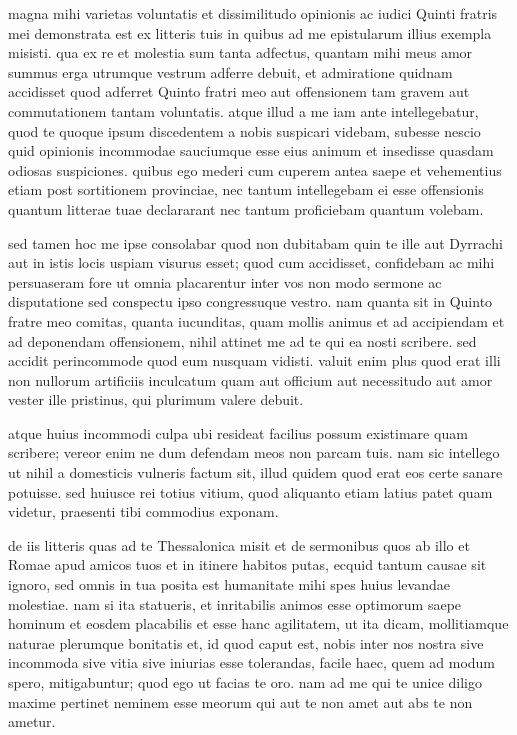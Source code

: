 


 magna mihi varietas voluntatis et dissimilitudo opinionis ac iudici Quinti fratris mei demonstrata est ex litteris tuis in quibus ad me epistularum illius exempla misisti. qua ex re et molestia sum tanta adfectus, quantam mihi meus amor summus erga utrumque vestrum adferre debuit, et admiratione quidnam accidisset quod adferret Quinto fratri meo aut offensionem tam gravem aut commutationem tantam voluntatis. atque illud a me iam ante intellegebatur, quod te quoque ipsum discedentem a nobis suspicari videbam, subesse nescio quid opinionis incommodae sauciumque esse eius animum et insedisse quasdam odiosas suspiciones. quibus ego mederi cum cuperem antea saepe et vehementius etiam post sortitionem provinciae, nec tantum intellegebam ei esse offensionis quantum litterae tuae declararant nec tantum proficiebam quantum volebam.

 sed tamen hoc me ipse consolabar quod non dubitabam quin te ille aut Dyrrachi aut in istis locis uspiam visurus esset; quod cum accidisset, confidebam ac mihi persuaseram fore ut omnia placarentur inter vos non modo sermone ac disputatione sed conspectu ipso congressuque vestro. nam quanta sit in Quinto fratre meo comitas, quanta iucunditas, quam mollis animus et ad accipiendam et ad deponendam offensionem, nihil attinet me ad te qui ea nosti scribere. sed accidit perincommode quod eum nusquam vidisti. valuit enim plus quod erat illi non nullorum artificiis inculcatum quam aut officium aut necessitudo aut amor vester ille pristinus, qui plurimum valere debuit.

 atque huius incommodi culpa ubi resideat facilius possum existimare quam scribere; vereor enim ne dum defendam meos non parcam tuis. nam sic intellego ut nihil a domesticis vulneris factum sit, illud quidem quod erat eos certe sanare potuisse. sed huiusce rei totius vitium, quod aliquanto etiam latius patet quam videtur, praesenti tibi commodius exponam.

 de iis litteris quas ad te Thessalonica misit et de sermonibus quos ab illo et Romae apud amicos tuos et in itinere habitos putas, ecquid tantum causae sit ignoro, sed omnis in tua posita est humanitate mihi spes huius levandae molestiae. nam si ita statueris, et inritabilis animos esse optimorum saepe hominum et eosdem placabilis et esse hanc agilitatem, ut ita dicam, mollitiamque naturae plerumque bonitatis et, id quod caput est, nobis inter nos nostra sive incommoda sive vitia sive iniurias esse tolerandas, facile haec, quem ad modum spero, mitigabuntur; quod ego ut facias te oro. nam ad me qui te unice diligo maxime pertinet neminem esse meorum qui aut te non amet aut abs te non ametur.

